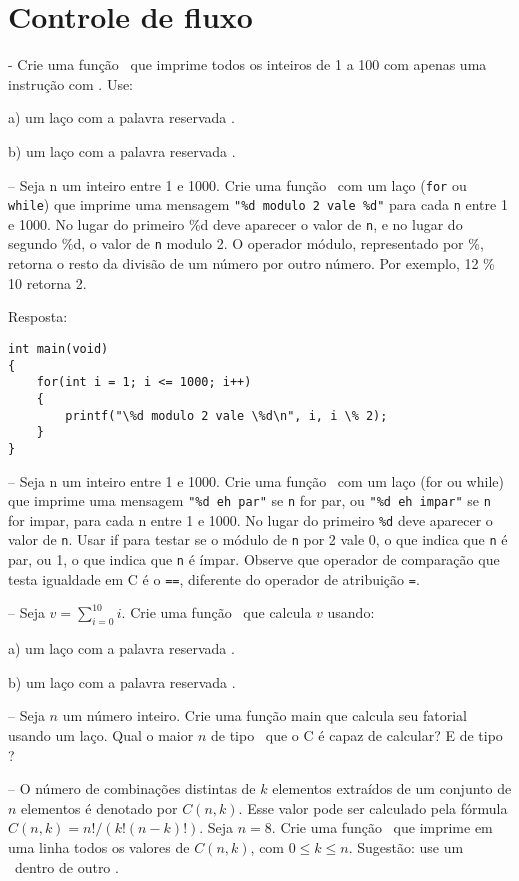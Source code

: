 \zeraquest

\section{Controle de fluxo}

\quest - Crie uma função \MAIN\ que imprime todos os inteiros de 1 a 100 com apenas uma instrução com \PRINTF. Use:

	a) um laço com a palavra reservada \WHILE.

	b) um laço com a palavra reservada \FOR.

\NEWLINE
\quest – Seja n um inteiro entre 1 e 1000. Crie uma função \MAIN\ com um laço ({\tt for} ou {\tt while}) que imprime uma mensagem \verb|"%d modulo 2 vale %d"| para cada {\tt n} entre 1 e 1000. No lugar do primeiro \%d deve aparecer o valor de {\tt n}, e no lugar do segundo \%d, o valor de {\tt n} modulo 2. O operador módulo, representado por \%, retorna o resto da divisão de um número por outro número. Por exemplo, 12 \% 10 retorna 2.

\NEWLINE
	Resposta:

\begin{lstlisting}
int main(void)
{
    for(int i = 1; i <= 1000; i++)
    {
        printf("\%d modulo 2 vale \%d\n", i, i \% 2);
    }
}
\end{lstlisting}

\NEWLINE
\quest – Seja n um inteiro entre 1 e 1000. Crie uma função \MAIN\ com um laço (for ou while) que imprime uma mensagem \verb|"%d eh par"| se {\tt n} for par, ou \verb|"%d eh impar"| se {\tt n} for impar, para cada n entre 1 e 1000. No lugar do primeiro \verb|%d| deve aparecer o valor de {\tt n}. Usar if para testar se o módulo de {\tt n} por 2 vale 0, o que indica que {\tt n} é par, ou 1, o que indica que {\tt n} é ímpar. Observe que operador de comparação que testa igualdade em C é o {\tt ==}, diferente do operador de atribuição {\tt =}.

\NEWLINE
\quest – Seja $v = \sum_{i=0}^{10}i$. Crie uma função \MAIN\ que calcula $v$ usando:

	a) um laço com a palavra reservada \WHILE.

	b) um laço com a palavra reservada \FOR.

\NEWLINE
\quest – Seja $n$ um número inteiro. Crie uma função main que calcula seu fatorial usando um laço. Qual o maior $n$ de tipo \INT\ que o C é capaz de calcular? E de tipo \LONGINT?

\NEWLINE
\quest – O número de combinações distintas de $k$ elementos extraídos de um conjunto de $n$ elementos é denotado por $C(n, k)$. Esse valor pode ser calculado pela fórmula $C(n, k) = n! / (k! (n-k)!)$. Seja $n=8$. Crie uma função \MAIN\ que imprime em uma linha todos os valores de $C(n, k)$, com $0 \leq k \leq n$. Sugestão: use um \FOR\ dentro de outro \FOR.

